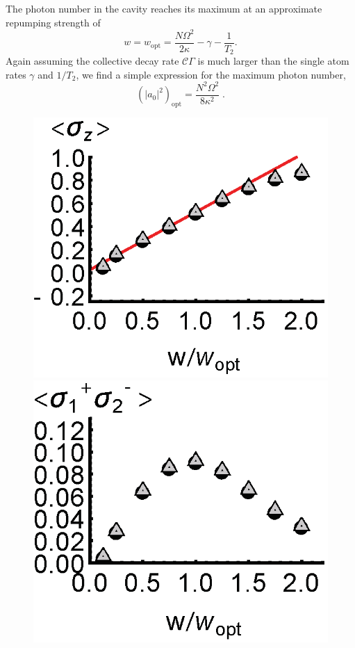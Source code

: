 \documentclass[aps,
twocolumn,
showpacs,
superscriptaddress,groupedaddress]{revtex4}
\begin{document}
The photon number in the cavity reaches its maximum at an approximate
repumping strength of
\begin{equation}
  w=w_{\mathrm{opt}}= \frac{N \Omega^2}{2\kappa} - \gamma - \frac{1}{T_2}.
\label{wopt}
\end{equation}
Again assuming the collective decay rate $\mathcal{C}\Gamma$ is much
larger than the single atom rates $\gamma$ and $1/T_2$, we find a
simple expression for the maximum photon number,
\begin{equation}
(|a_0|^2)_{\mathrm{opt}}= \frac{N^2 \Omega^2}{8\kappa^2}\;.
\label{adaopt}
\end{equation}

\begin{figure}
\begin{center}
	\includegraphics[scale =0.38] {N40SuperradianceSZ.eps}
	\hspace{-5.0mm} \includegraphics[scale =0.38] {N40SuperradianceSPSM.eps}

\end{center}
\end{figure}
\end{document}
